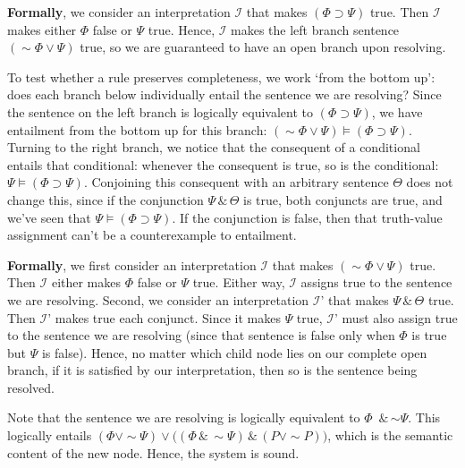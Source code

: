 \documentclass[12pt]{article}
\def\eor{\ensuremath{\vee}}
\def\eand{\ensuremath{\,\&\,}}
\def\eif{\ensuremath{\supset}}
\def\enot{\ensuremath{{\sim}}} %
\let\oldsim\sim %
\renewcommand{\sim}{{\oldsim}} %
\def\metaA{\ensuremath{\varPhi}}
\def\metaB{\ensuremath{\varPsi}}
\newcommand*{\metav}[1]{\ensuremath{\mathcal{#1}}}
\begin{document}
\begin{enumerate}
\textbf{Formally}, we consider an interpretation \metav{I} that makes $(\metaA{} \eif \metaB{})$ true. Then \metav{I} makes either \metaA{} false or \metaB{} true. Hence, \metav{I} makes the left branch sentence $(\enot \metaA{} \eor \metaB{})$ true, so we are guaranteed to have an open branch upon resolving. 

To test whether a rule preserves completeness, we work `from the bottom up': does each branch below individually entail the sentence we are resolving? Since the sentence on the left branch is logically equivalent to $(\metaA{} \eif \metaB{})$, we have entailment from the bottom up for this branch: $(\enot \metaA{} \eor \metaB{}) \models (\metaA{} \eif \metaB{})$. Turning to the right branch, we notice that the consequent of a conditional entails that conditional: whenever the consequent is true, so is the conditional: $\metaB{} \models (\metaA{} \eif \metaB{})$. Conjoining this consequent with an arbitrary sentence $\Theta$ does not change this, since if the conjunction $\metaB{} \eand \Theta$ is true, both conjuncts are true, and we've seen that $\metaB{} \models (\metaA{} \eif \metaB{})$. If the conjunction is false, then that truth-value assignment can't be a counterexample to entailment. 

\textbf{Formally}, we first consider an interpretation \metav{I} that makes $(\enot \metaA{} \eor \metaB{})$ true. Then \metav{I} either makes \metaA{} false or \metaB{} true. Either way, \metav{I} assigns true to the sentence we are resolving. Second, we consider an interpretation \metav{I}' that makes $\metaB{} \eand \Theta$ true. Then \metav{I}' makes true each conjunct. Since it makes $\metaB{}$ true, \metav{I}' must also assign true to the sentence we are resolving (since that sentence is false only when \metaA{} is true but \metaB{} is false). Hence, no matter which child node lies on our complete open branch, if it is satisfied by our interpretation, then so is the sentence being resolved. \\




Note that the sentence we are resolving is logically equivalent to \metaA{} \eand \enot \metaB{}. This logically entails $(\metaA{} \eor \enot \metaB{}) \eor \big ( (\metaA{} \eand \enot \metaB{}) \eand (P \eor \enot P) \big )$, which is the semantic content of the new node. Hence, the system is sound.


\end{enumerate}
\end{document}
